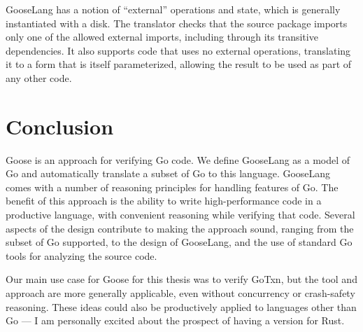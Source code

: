 GooseLang has a notion of ``external'' operations and state, which is generally
instantiated with a disk. The translator checks that the source package imports
only one of the allowed external imports, including through its transitive
dependencies. It also supports code that uses no external operations,
translating it to a form that is itself parameterized, allowing the result to be
used as part of any other code.

\section{Conclusion}

Goose is an approach for verifying Go code. We define GooseLang as a model of Go
and automatically translate a subset of Go to this language. GooseLang comes
with a number of reasoning principles for handling features of Go. The benefit
of this approach is the ability to write high-performance code in a
productive language, with convenient reasoning while verifying
that code. Several aspects of the design contribute to making the approach
sound, ranging from the subset of Go supported, to the design of GooseLang, and
the use of standard Go tools for analyzing the source code.

Our main use case for Goose for this thesis was to verify GoTxn, but
the tool and approach are more generally applicable, even without concurrency or
crash-safety reasoning. These ideas could also be productively applied to
languages other than Go --- I am personally excited about the prospect of having
a version for Rust.
